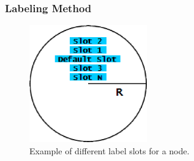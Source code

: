 \documentclass[]{article}
\begin{document}
{%






\subsubsection{Labeling Method}
\label{se:labels}

\begin{figure}[t]
\centering
\includegraphics[width=2.0in]{images/label_slot2}
\caption{Example of different label slots for a node.}
\label{fig_slots}
\end{figure}


}
\end{document}
